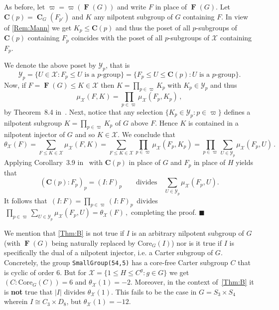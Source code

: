 \documentclass[a4paper,12pt,reqno]{amsart}
\numberwithin{equation}{section}
\DeclareMathOperator{\fitt}{\mathbf{F}}
\DeclareMathOperator{\cent}{\mathbf{C}}
\newcommand{\card}[1]{\left\lvert{#1}\right\rvert}
\renewcommand{\leq}{\leqslant}
\newenvironment{proofofB}{{\bf {Proof of Theorem \ref{Thm:B}.} }}{\hfill $\blacksquare$ \\}
\def\C_p{{\mathbf{C}(p)}}
\begin{document}
\begin{proofofB}
As before, let $\varpi = \varpi(\fitt(G))$ 
and write $F$ in place of $\fitt(G)$.
Let $\C_p = \cent_G(F_{p'})$ and $K$ any nilpotent subgroup of $G$ containing $F$. In view of \autoref{Rem:Mann} we get $K_p \leq \C_p$ and thus   the poset of all $p$-subgroups of $\C_p$ containing $F_p$ 
coincides with the poset of all $p$-subgroups of $\mathcal{X}$ containing $F_p $. 

We denote the above poset by $\mathcal{Y}_p$, that is 
\[
\mathcal{Y}_p = \{ U \in \mathcal{X} : F_p \leq U \text{ is a $p$-group} \} = \{ F_p \leq U \leq \C_p : U \text{ is a $p$-group}\}.  
\]
Now, if $F=\fitt(G) \leq K \in \mathcal{X}$ 
then $K = \prod_{p \in \varpi} K_p$ 
with $K_p \in \mathcal{Y}_p$ and thus 
\[
\mu_{\mathcal{X}}(F, K) = \prod_{p \in \varpi} \mu_{\mathcal{X}}(F_p, K_p)\,,
\]
by Theorem~8.4 in~\cite{mobius}.
Next, notice that any selection $\{ K_p \in \mathcal{Y}_p : p \in \varpi \}$ 
defines a nilpotent subgroup $K = \prod_{p \in \varpi} K_p$ of $G$ above $F$. 
Hence $K$ is contained in a nilpotent injector of $G$ and so $K \in \mathcal{X}$. 
We conclude that 
\begin{equation}
\theta_{\mathcal{X}}(F) =  \sum_{F \leq K \in \mathcal{X}} \mu_{\mathcal{X}}(F, K) 
                        = \sum_{F \leq K \in \mathcal{X}}
                           \prod_{p \in \varpi} \mu_{\mathcal{X}}(F_p, K_p) 
                        = \prod_{p \in \varpi} \sum_{U \in \mathcal{Y}_p} \mu_{\mathcal{X}}(F_p, U)\,.
\end{equation}
Applying Corollary~3.9 in~\cite{mobius} 
with $\C_p$ in place of $G$
and $F_p$ in place of $H$ yields that 
\[
(\C_p : F_p)_p = (I : F)_p \quad\quad \mbox{divides} \quad \sum_{U \in \mathcal{Y}_p} \mu_{\mathcal{X}}(F_p, U).
\]
It follows that
$\, (I : F) = \prod_{p \in \varpi} (I : F)_p\, $  divides 
$\, \prod_{p \in \varpi} \sum_{U \in \mathcal{Y}_p} \mu_{\mathcal{X}}(F_p, U)
= \theta_{\mathcal{X}}(F)\, , $
completing the proof.
\end{proofofB}

We mention that \autoref{Thm:B} is not true if $I$
is an arbitrary nilpotent subgroup of $G$ 
(with $\fitt(G)$ being naturally replaced by $\mathrm{Core}_G(I)$)
nor is it true if $I$ is specifically the dual of a nilpotent injector,
i.e. a Carter subgroup of $G$.
Concretely, the group \texttt{SmallGroup(54,5)} has a core-free
Carter subgroup $C$ that is cyclic of order $6$. 
But for $\mathcal{X} = \{1 \leq H \leq C^g : g \in G\}$ we get 
$(C : \mathrm{Core}_G(C)) = 6$ and  $\theta_{\mathcal{X}}(1) = -2$. 
Moreover, in the context of~\autoref{Thm:B} it is \textbf{not} true
that $\card{I}$ divides $\theta_{\mathcal{X}}(1)$.
This fails to be the case in $G = S_3 \times S_4$ wherein $I \cong C_3 \times D_8$,
but $\theta_{\mathcal{X}}(1) = -12$.
\end{document}
